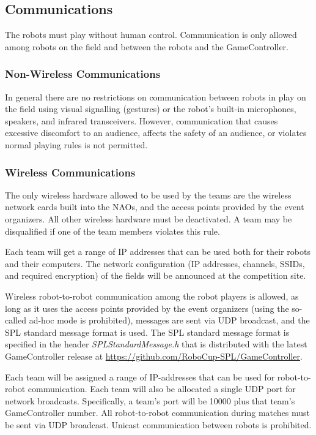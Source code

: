 \subsection{Communications}

The robots must play without human control. Communication is only allowed among robots on the field and between the robots and the GameController.

\subsubsection{Non-Wireless Communications}
\label{sec:acoustic}
In general there are no restrictions on communication between robots in play on the field using visual signalling (\eg gestures) or the robot's built-in microphones, speakers, and infrared transceivers. However, communication that causes excessive discomfort to an audience, affects the safety of an audience, or violates normal playing rules is not permitted.

\subsubsection{Wireless Communications}
\label{sec:wireless}
The only wireless hardware allowed to be used by the teams are the wireless network cards built into the NAOs, and the access points provided by the event organizers. All other wireless hardware must be deactivated. A team may be disqualified if one of the team members violates this rule.

Each team will get a range of IP addresses that can be used both for their robots and their computers. The network configuration (\eg IP addresses, channels, SSIDs, and required encryption) of the fields will be announced at the competition site.

Wireless robot-to-robot communication among the robot players is allowed, as long as it uses the access points provided by the event organizers (using the so-called ad-hoc mode is prohibited), messages are sent via UDP broadcast, and the SPL standard message format is used. The SPL standard message format is specified in the header \emph{SPLStandardMessage.h} that is distributed with the latest GameController release at \url{https://github.com/RoboCup-SPL/GameController}.

Each team will be assigned a range of IP-addresses that can be used for robot-to-robot communication. Each team will also be allocated a single UDP port for network broadcasts. Specifically, a team's port will be 10000 plus that team's GameController number. All robot-to-robot communication during matches must be sent via UDP broadcast. Unicast communication between robots is prohibited.

